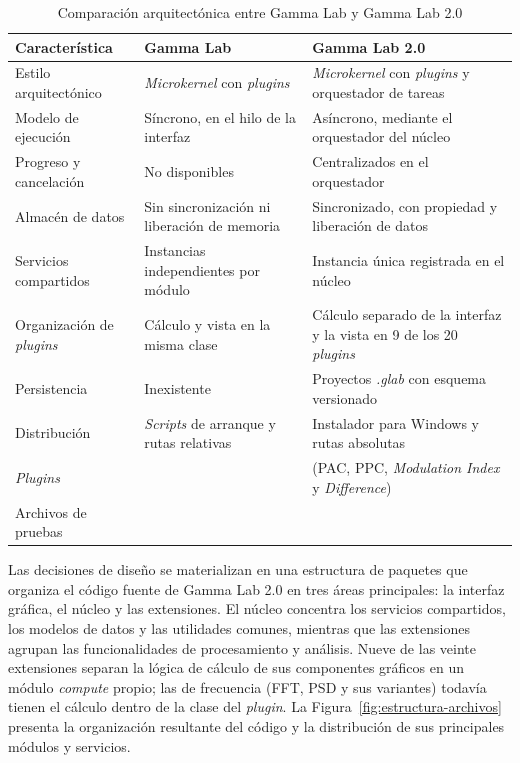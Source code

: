 \documentclass[12pt,letterpaper,oneside]{article}
\begin{document}
\begin{table}[H]
\centering
\scriptsize
\renewcommand{\arraystretch}{1.3}
\begin{tabularx}{\textwidth}{|l|>{\raggedright\arraybackslash}X|>{\raggedright\arraybackslash}X|}
\hline
\textbf{Característica} & \textbf{Gamma Lab} & \textbf{Gamma Lab 2.0} \\
\hline
Estilo arquitectónico & \textit{Microkernel} con \textit{plugins} & \textit{Microkernel} con \textit{plugins} y orquestador de tareas \\
\hline
Modelo de ejecución & Síncrono, en el hilo de la interfaz & Asíncrono, mediante el orquestador del núcleo \\
\hline
Progreso y cancelación & No disponibles & Centralizados en el orquestador \\
\hline
Almacén de datos & Sin sincronización ni liberación de memoria & Sincronizado, con propiedad y liberación de datos \\
\hline
Servicios compartidos & Instancias independientes por módulo & Instancia única registrada en el núcleo \\
\hline
Organización de \textit{plugins} & Cálculo y vista en la misma clase & Cálculo separado de la interfaz y la vista en 9 de los 20 \textit{plugins} \\
\hline
Persistencia & Inexistente & Proyectos \textit{.glab} con esquema versionado \\
\hline
Distribución & \textit{Scripts} de arranque y rutas relativas & Instalador para Windows y rutas absolutas \\
\hline
\textit{Plugins} & 16 & 20 (PAC, PPC, \textit{Modulation Index} y \textit{Difference}) \\
\hline
Archivos de pruebas & 14 & 81 \\
\hline
\end{tabularx}
\caption{Comparación arquitectónica entre Gamma Lab y Gamma Lab 2.0}
\label{tab:comparacion_arquitectura}
\end{table}

Las decisiones de diseño se materializan en una estructura de paquetes que organiza el código fuente de Gamma Lab 2.0 en tres áreas principales: la interfaz gráfica, el núcleo y las extensiones. El núcleo concentra los servicios compartidos, los modelos de datos y las utilidades comunes, mientras que las extensiones agrupan las funcionalidades de procesamiento y análisis. Nueve de las veinte extensiones separan la lógica de cálculo de sus componentes gráficos en un módulo \textit{compute} propio; las de frecuencia (FFT, PSD y sus variantes) todavía tienen el cálculo dentro de la clase del \textit{plugin}. La Figura~\ref{fig:estructura-archivos} presenta la organización resultante del código y la distribución de sus principales módulos y servicios.
\end{document}
